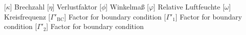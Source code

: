 \begin{acronym}[-------------------]
		[$\kappa$]		{\acrounit{-}
		Brechzahl
	} %
			[$\eta$]		{\acrounit{-}
		Verlustfaktor
	}
			[$\phi$]		{\acrounit{\radian}
		Winkelmaß
	}
		[$\varphi$] 	{\acrounit{-}
		Relative Luftfeuchte
	} %
		[$\omega$]		{\acrounit{\radian\per\s}
		Kreisfrequenz	
	} %
	\bigskip 	%
		[$\Gamma'_{\mathrm{BC}}$]	{\acrounit{-} 
		Factor for boundary condition
	}
		[$\Gamma'_{\mathrm{1}}$]	{\acrounit{-} 
		Factor for boundary condition
	}
		[$\Gamma'_{\mathrm{2}}$]	{\acrounit{-} 
		Factor for boundary condition
	}
\end{acronym}
%
%
%
%
%
%
%
%
%
%
%
%
%
%
%
